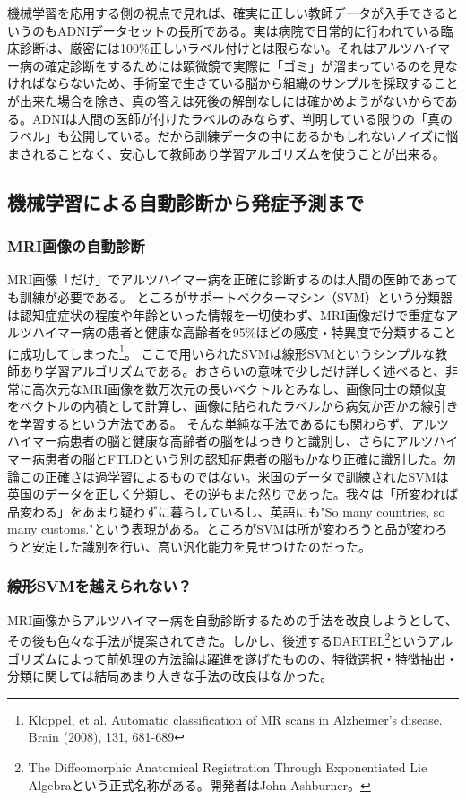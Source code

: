 機械学習を応用する側の視点で見れば、確実に正しい教師データが入手できるというのもADNIデータセットの長所である。実は病院で日常的に行われている臨床診断は、厳密には100\%正しいラベル付けとは限らない。それはアルツハイマー病の確定診断をするためには顕微鏡で実際に「ゴミ」が溜まっているのを見なければならないため、手術室で生きている脳から組織のサンプルを採取することが出来た場合を除き、真の答えは死後の解剖なしには確かめようがないからである。ADNIは人間の医師が付けたラベルのみならず、判明している限りの「真のラベル」も公開している。だから訓練データの中にあるかもしれないノイズに悩まされることなく、安心して教師あり学習アルゴリズムを使うことが出来る。
\subsection{機械学習による自動診断から発症予測まで}

\subsubsection{MRI画像の自動診断}
MRI画像「だけ」でアルツハイマー病を正確に診断するのは人間の医師であっても訓練が必要である。
ところがサポートベクターマシン（SVM）という分類器は認知症症状の程度や年齢といった情報を一切使わず、MRI画像だけで重症なアルツハイマー病の患者と健康な高齢者を95\%ほどの感度・特異度で分類することに成功してしまった\footnote{Kl\"{o}ppel, et al. Automatic classification of MR scans in Alzheimer's disease. Brain (2008), 131, 681-689}。
ここで用いられたSVMは線形SVMというシンプルな教師あり学習アルゴリズムである。おさらいの意味で少しだけ詳しく述べると、非常に高次元なMRI画像を数万次元の長いベクトルとみなし、画像同士の類似度をベクトルの内積として計算し、画像に貼られたラベルから病気か否かの線引きを学習するという方法である。
そんな単純な手法であるにも関わらず、アルツハイマー病患者の脳と健康な高齢者の脳をはっきりと識別し、さらにアルツハイマー病患者の脳とFTLDという別の認知症患者の脳もかなり正確に識別した。勿論この正確さは過学習によるものではない。米国のデータで訓練されたSVMは英国のデータを正しく分類し、その逆もまた然りであった。我々は「所変われば品変わる」をあまり疑わずに暮らしているし、英語にも"So many countries, so many customs."という表現がある。ところがSVMは所が変わろうと品が変わろうと安定した識別を行い、高い汎化能力を見せつけたのだった。

\subsubsection{線形SVMを越えられない？}
MRI画像からアルツハイマー病を自動診断するための手法を改良しようとして、その後も色々な手法が提案されてきた。しかし、後述するDARTEL\footnote{The Diffeomorphic Anatomical Registration Through Exponentiated Lie Algebraという正式名称がある。開発者はJohn Ashburner。}というアルゴリズムによって前処理の方法論は躍進を遂げたものの、特徴選択・特徴抽出・分類に関しては結局あまり大きな手法の改良はなかった。

